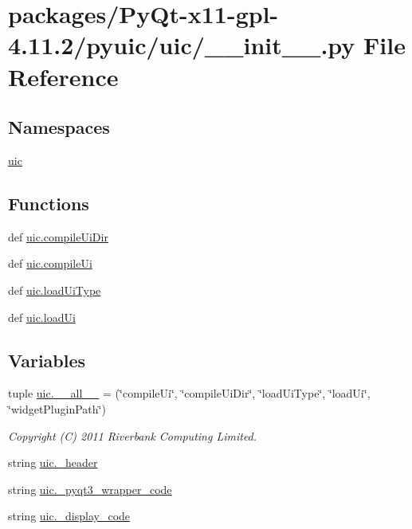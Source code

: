 \hypertarget{packages_2PyQt-x11-gpl-4_811_82_2pyuic_2uic_2____init_____8py}{}\section{packages/\+Py\+Qt-\/x11-\/gpl-\/4.11.2/pyuic/uic/\+\_\+\+\_\+init\+\_\+\+\_\+.py File Reference}
\label{packages_2PyQt-x11-gpl-4_811_82_2pyuic_2uic_2____init_____8py}
\subsection*{Namespaces}
\begin{DoxyCompactItemize}
\item 
 \hyperlink{namespaceuic}{uic}
\end{DoxyCompactItemize}
\subsection*{Functions}
\begin{DoxyCompactItemize}
\item 
def \hyperlink{namespaceuic_a80559c885b62b6fdeddb3209bf053d27}{uic.\+compile\+Ui\+Dir}
\item 
def \hyperlink{namespaceuic_afa948ddd825ba2d197fdd71f4a1ee6d8}{uic.\+compile\+Ui}
\item 
def \hyperlink{namespaceuic_afd88e234c1bf7173d30e9c9ef616aa90}{uic.\+load\+Ui\+Type}
\item 
def \hyperlink{namespaceuic_a3444f1dbcbd8cbac324bf5431a34046c}{uic.\+load\+Ui}
\end{DoxyCompactItemize}
\subsection*{Variables}
\begin{DoxyCompactItemize}
\item 
tuple \hyperlink{namespaceuic_a9165ae141c21fad5d69af0c68f31071a}{uic.\+\_\+\+\_\+all\+\_\+\+\_\+} = (\char`\"{}compile\+Ui\char`\"{}, \char`\"{}compile\+Ui\+Dir\char`\"{}, \char`\"{}load\+Ui\+Type\char`\"{}, \char`\"{}load\+Ui\char`\"{}, \char`\"{}widget\+Plugin\+Path\char`\"{})
\begin{DoxyCompactList}\small\item\em Copyright (C) 2011 Riverbank Computing Limited. \end{DoxyCompactList}\item 
string \hyperlink{namespaceuic_ac11c9d62ce8fcd772f62df45d1cc083b}{uic.\+\_\+header}
\item 
string \hyperlink{namespaceuic_a571c9a8385966ab3b752b4965cdf796c}{uic.\+\_\+pyqt3\+\_\+wrapper\+\_\+code}
\item 
string \hyperlink{namespaceuic_a3512e5fb75547c269fdd6bb7224de6b3}{uic.\+\_\+display\+\_\+code}
\end{DoxyCompactItemize}
